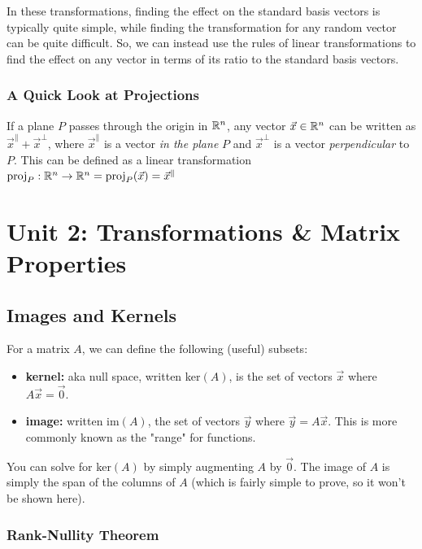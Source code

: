 \documentclass[12pt]{article}
\begin{document}
In these transformations, finding the effect on the standard basis vectors is typically quite simple, while finding the transformation for any random vector can be quite difficult. So, we can instead use the rules of linear transformations to find the effect on any vector in terms of its ratio to the standard basis vectors.

\subsubsection{A Quick Look at Projections}

If a plane $P$ passes through the origin in $\mathbb{R}^n$, any vector $\Vec{x} \in \mathbb{R}^n$ can be written as $\Vec{x}^{\parallel} + \Vec{x}^{\perp}$, where $\Vec{x}^{\parallel}$ is a vector \textit{in the plane} $P$ and $\Vec{x}^{\perp}$ is a vector \textit{perpendicular} to $P$. This can be defined as a linear transformation $\text{proj}_P:\mathbb{R}^n \to \mathbb{R}^n = \text{proj}_P(\Vec{x}) = \Vec{x}^{\parallel}$

\section[Unit 2]{Unit 2: Transformations \& Matrix Properties}
\subsection{Images and Kernels}

For a matrix $A$, we can define the following (useful) subsets:

\begin{itemize}
    \item \textbf{kernel:} aka null space, written ker$(A)$, is the set of vectors $\Vec{x}$ where $A\Vec{x} = \Vec{0}$.
    
    \item \textbf{image:} written im$(A)$, the set of vectors $\Vec{y}$ where $\Vec{y} = A\Vec{x}$. This is more commonly known as the "range" for functions.
\end{itemize}

You can solve for ker$(A)$ by simply augmenting $A$ by $\Vec{0}$. The image of $A$ is simply the span of the columns of $A$ (which is fairly simple to prove, so it won't be shown here).

\subsubsection{Rank-Nullity Theorem}
\end{document}
